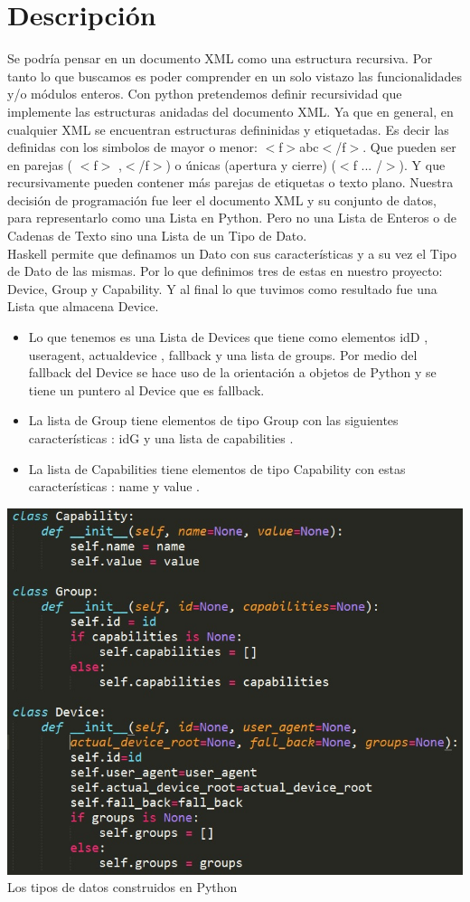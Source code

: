 \documentclass[11pt]{article} %
\begin{document}
\section{Descripción}
Se podría pensar en un documento XML como una estructura recursiva. Por tanto lo que buscamos es poder comprender en un solo vistazo las funcionalidades y/o módulos enteros. Con python pretendemos definir recursividad que implemente las estructuras anidadas del documento XML. Ya que en general, en cualquier XML se encuentran estructuras defininidas y etiquetadas. Es decir las definidas con los simbolos de mayor o menor: $<$f$>$abc$<$/f$>$. Que pueden ser en parejas  ( $<$f$>$ ,$<$/f$>$) o únicas (apertura y cierre) ($<$f ... /$>$). Y que recursivamente pueden contener más parejas de etiquetas o texto plano.
Nuestra decisión de programación fue leer el documento XML y su conjunto de datos, para representarlo como una Lista en Python. Pero no una Lista de Enteros o de Cadenas de Texto sino una Lista de un Tipo de Dato. \\ Haskell permite que definamos un Dato con sus características y a su vez el Tipo de Dato de las mismas. Por lo que definimos tres de estas en nuestro proyecto: Device, Group y Capability. Y al final lo que tuvimos como resultado fue una Lista que almacena Device.
\begin{itemize}
\item Lo que tenemos es una Lista de Devices que tiene como elementos  idD , useragent, actualdevice , fallback  y una lista de groups. Por medio del fallback del Device se hace uso de la orientación a objetos de Python y se tiene un puntero al Device que es fallback.
\item La lista de Group tiene  elementos  de tipo Group con las siguientes características : idG y  una lista de capabilities .
\item La lista de Capabilities tiene elementos de tipo Capability con estas características : name  y value .
\end {itemize}
\begin{center}
\includegraphics[scale=0.55]{Imagenes/1.jpg}
\\ Los tipos de datos construidos en Python
\end{center}
\end{document}
